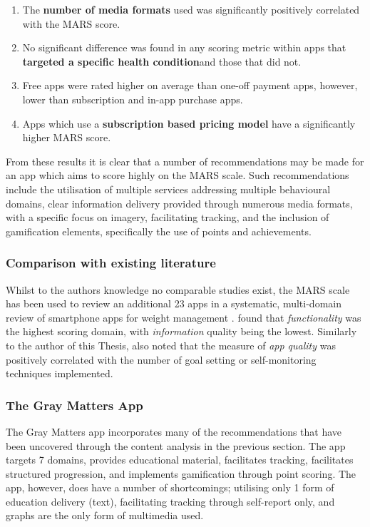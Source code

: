 \begin{enumerate}[noitemsep,topsep=0pt]
\item The \textbf{number of media formats} used was significantly positively correlated with the MARS score.
\item No significant difference was found in any scoring metric within apps that \textbf{targeted a specific health condition}and those that did not.
\item Free apps were rated higher on average than one-off payment apps, however, lower than subscription and in-app purchase apps.
\item Apps which use a \textbf{subscription based pricing model} have a significantly higher MARS score.
\end{enumerate}

From these results it is clear that a number of recommendations may be made for an app which aims to score highly on the MARS scale. Such recommendations include the utilisation of multiple services addressing multiple behavioural domains, clear information delivery provided through numerous media formats, with a specific focus on imagery, facilitating tracking, and the inclusion of gamification elements, specifically the use of points and achievements.

\subsubsection{Comparison with existing literature}
Whilst to the authors knowledge no comparable studies exist, the MARS scale has been used to review an additional 23 apps in a systematic, multi-domain review of smartphone apps for weight management \cite{Bardus2016}. \citeauthor{Bardus2016} found that \textit{functionality} was the highest scoring domain, with \textit{information} quality being the lowest. Similarly to the author of this Thesis, \citeauthor{Bardus2016} also noted that the measure of \textit{app quality} was positively correlated with the number of goal setting or self-monitoring techniques implemented.

\subsubsection{The Gray Matters App}
The Gray Matters app incorporates many of the recommendations that have been uncovered through the content analysis in the previous section. The app targets 7 domains, provides educational material, facilitates tracking, facilitates structured progression, and implements gamification through point scoring. The app, however, does have a number of shortcomings; utilising only 1 form of education delivery (text), facilitating tracking through self-report only, and graphs are the only form of multimedia used.

